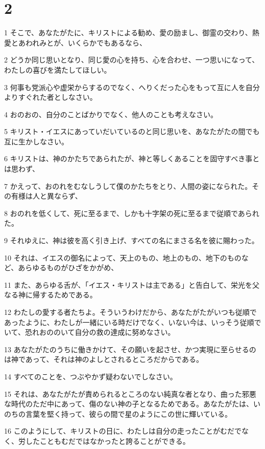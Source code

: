 \chapter{2}

\par 1 そこで、あなたがたに、キリストによる勧め、愛の励まし、御霊の交わり、熱愛とあわれみとが、いくらかでもあるなら、
\par 2 どうか同じ思いとなり、同じ愛の心を持ち、心を合わせ、一つ思いになって、わたしの喜びを満たしてほしい。
\par 3 何事も党派心や虚栄からするのでなく、へりくだった心をもって互に人を自分よりすぐれた者としなさい。
\par 4 おのおの、自分のことばかりでなく、他人のことも考えなさい。
\par 5 キリスト・イエスにあっていだいているのと同じ思いを、あなたがたの間でも互に生かしなさい。
\par 6 キリストは、神のかたちであられたが、神と等しくあることを固守すべき事とは思わず、
\par 7 かえって、おのれをむなしうして僕のかたちをとり、人間の姿になられた。その有様は人と異ならず、
\par 8 おのれを低くして、死に至るまで、しかも十字架の死に至るまで従順であられた。
\par 9 それゆえに、神は彼を高く引き上げ、すべての名にまさる名を彼に賜わった。
\par 10 それは、イエスの御名によって、天上のもの、地上のもの、地下のものなど、あらゆるものがひざをかがめ、
\par 11 また、あらゆる舌が、「イエス・キリストは主である」と告白して、栄光を父なる神に帰するためである。
\par 12 わたしの愛する者たちよ。そういうわけだから、あなたがたがいつも従順であったように、わたしが一緒にいる時だけでなく、いない今は、いっそう従順でいて、恐れおののいて自分の救の達成に努めなさい。
\par 13 あなたがたのうちに働きかけて、その願いを起させ、かつ実現に至らせるのは神であって、それは神のよしとされるところだからである。
\par 14 すべてのことを、つぶやかず疑わないでしなさい。
\par 15 それは、あなたがたが責められるところのない純真な者となり、曲った邪悪な時代のただ中にあって、傷のない神の子となるためである。あなたがたは、いのちの言葉を堅く持って、彼らの間で星のようにこの世に輝いている。
\par 16 このようにして、キリストの日に、わたしは自分の走ったことがむだでなく、労したこともむだではなかったと誇ることができる。
